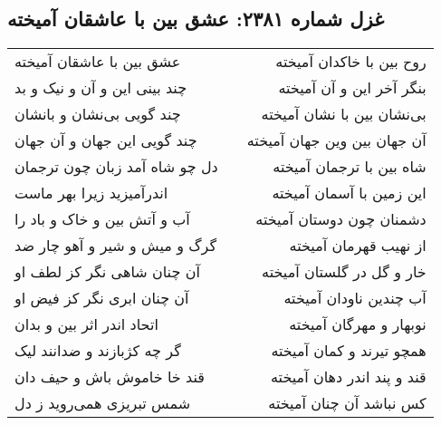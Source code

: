 \begin{center}
\section*{غزل شماره ۲۳۸۱: عشق بین با عاشقان آمیخته}
\label{sec:2381}
\begin{longtable}{l p{0.5cm} r}
عشق بین با عاشقان آمیخته
&&
روح بین با خاکدان آمیخته
\\
چند بینی این و آن و نیک و بد
&&
بنگر آخر این و آن آمیخته
\\
چند گویی بی‌نشان و بانشان
&&
بی‌نشان بین با نشان آمیخته
\\
چند گویی این جهان و آن جهان
&&
آن جهان بین وین جهان آمیخته
\\
دل چو شاه آمد زبان چون ترجمان
&&
شاه بین با ترجمان آمیخته
\\
اندرآمیزید زیرا بهر ماست
&&
این زمین با آسمان آمیخته
\\
آب و آتش بین و خاک و باد را
&&
دشمنان چون دوستان آمیخته
\\
گرگ و میش و شیر و آهو چار ضد
&&
از نهیب قهرمان آمیخته
\\
آن چنان شاهی نگر کز لطف او
&&
خار و گل در گلستان آمیخته
\\
آن چنان ابری نگر کز فیض او
&&
آب چندین ناودان آمیخته
\\
اتحاد اندر اثر بین و بدان
&&
نوبهار و مهرگان آمیخته
\\
گر چه کژبازند و ضدانند لیک
&&
همچو تیرند و کمان آمیخته
\\
قند خا خاموش باش و حیف دان
&&
قند و پند اندر دهان آمیخته
\\
شمس تبریزی همی‌روید ز دل
&&
کس نباشد آن چنان آمیخته
\\
\end{longtable}
\end{center}
